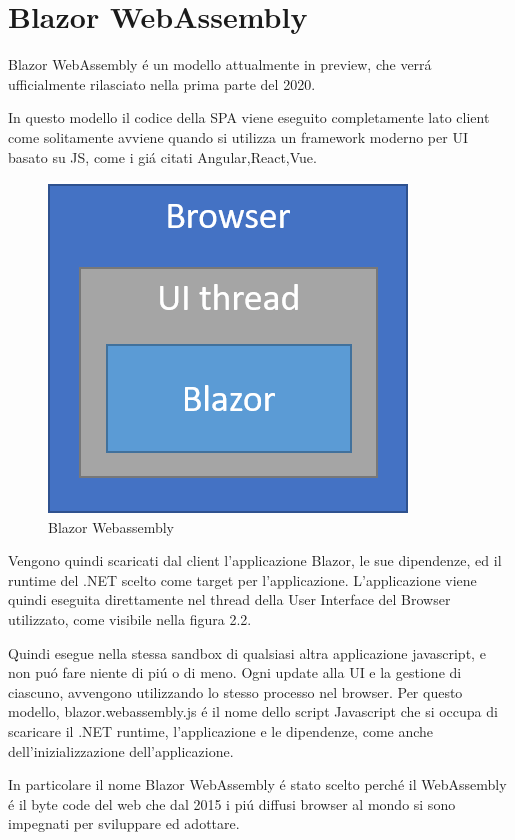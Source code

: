 \section{Blazor WebAssembly}\label{sez:bclient}
Blazor WebAssembly \'e un modello attualmente in preview, che verr\'a ufficialmente rilasciato nella prima parte del 2020.

In questo modello il codice della SPA viene eseguito completamente lato client come solitamente avviene quando si utilizza un framework moderno per UI basato su JS, come i gi\'a citati Angular,React,Vue.

\begin{figure}[H]
	\centerline{\includegraphics[scale=0.6]{figure/blazor-webassembly.png}}
	\caption{Blazor Webassembly}
	\label{fig:BlazorWebassembly}
\end{figure}

Vengono quindi scaricati dal client l'applicazione Blazor, le sue dipendenze, ed il runtime del .NET scelto come target per l'applicazione.
L'applicazione viene quindi eseguita direttamente nel thread della User Interface del Browser utilizzato, come visibile nella figura 2.2.

Quindi esegue nella stessa sandbox di qualsiasi altra applicazione javascript, e non pu\'o fare niente di pi\'u o di meno. Ogni update alla UI e la gestione di ciascuno, avvengono utilizzando lo stesso processo nel browser. Per questo modello, blazor.webassembly.js \'e il nome dello script Javascript che si occupa di scaricare il .NET runtime, l'applicazione e le dipendenze, come anche dell'inizializzazione dell'applicazione. 

In particolare il nome Blazor WebAssembly \'e stato scelto perch\'e il WebAssembly \'e il byte code del web che dal 2015 i pi\'u diffusi browser al mondo si sono impegnati per sviluppare ed adottare.


